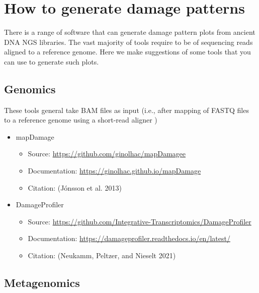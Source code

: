 \documentclass[
  letterpaper,
  DIV=11,
  numbers=noendperiod]{scrreprt}
\providecommand{\tightlist}{%
  \setlength{\itemsep}{0pt}\setlength{\parskip}{0pt}}\usepackage{longtable,booktabs,array}
\begin{document}
\hypertarget{how-to-generate-damage-patterns}{%
\section*{How to generate damage
patterns}\label{how-to-generate-damage-patterns}}


There is a range of software that can generate damage pattern plots from
ancient DNA NGS libraries. The vast majority of tools require to be of
sequencing reads aligned to a reference genome. Here we make suggestions
of some tools that you can use to generate such plots.

\hypertarget{genomics}{%
\subsection*{Genomics}\label{genomics}}

These tools general take BAM files as input (i.e., after mapping of
FASTQ files to a reference genome using a short-read aligner )

\begin{itemize}
\tightlist
\item
  mapDamage

  \begin{itemize}
  \tightlist
  \item
    Source:
    \href{https://github.com/ginolhac/mapDamage}{https://github.com/ginolhac/mapDamagee}
  \item
    Documentation: \url{https://ginolhac.github.io/mapDamage}
  \item
    Citation: (Jónsson et al. 2013)
  \end{itemize}
\item
  DamageProfiler

  \begin{itemize}
  \tightlist
  \item
    Source:
    \url{https://github.com/Integrative-Transcriptomics/DamageProfiler}
  \item
    Documentation:
    \url{https://damageprofiler.readthedocs.io/en/latest/}
  \item
    Citation: (Neukamm, Peltzer, and Nieselt 2021)
  \end{itemize}
\end{itemize}

\hypertarget{metagenomics}{%
\subsection*{Metagenomics}\label{metagenomics}}
\end{document}
